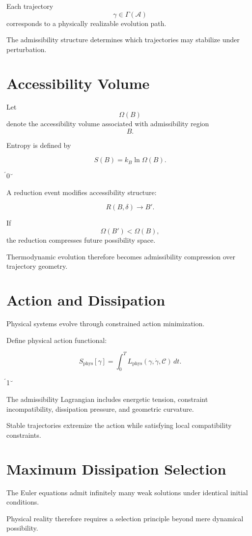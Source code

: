\documentclass[12pt,openany]{book}
\theoremstyle{plain}
\theoremstyle{definition}
\theoremstyle{remark}
\begin{document}
Each trajectory
\[
\gamma \in \Gamma(\mathcal{A})
\]
corresponds to a physically realizable evolution path.

The admissibility structure determines which trajectories may
stabilize under perturbation.

\section{Accessibility Volume}

Let
\[
\Omega(B)
\]
denote the accessibility volume associated with admissibility
region
\[
B.
\]

Entropy is defined by

\[
S(B)
=
k_B \ln \Omega(B).
\]

0

A reduction event modifies accessibility structure:

\[
R(B,\delta)\to B'.
\]

If
\[
\Omega(B') < \Omega(B),
\]
the reduction compresses future possibility space.

Thermodynamic evolution therefore becomes admissibility
compression over trajectory geometry.

\section{Action and Dissipation}

Physical systems evolve through constrained action minimization.

Define physical action functional:

\[
S_{\mathrm{phys}}[\gamma]
=
\int_0^T
L_{\mathrm{phys}}
(\gamma,\dot\gamma,\mathcal{C})
\,dt.
\]

1

The admissibility Lagrangian includes energetic tension,
constraint incompatibility, dissipation pressure, and geometric
curvature.

Stable trajectories extremize the action while satisfying local
compatibility constraints.

\section{Maximum Dissipation Selection}

The Euler equations admit infinitely many weak solutions under
identical initial conditions.

Physical reality therefore requires a selection principle beyond
mere dynamical possibility.
\end{document}
